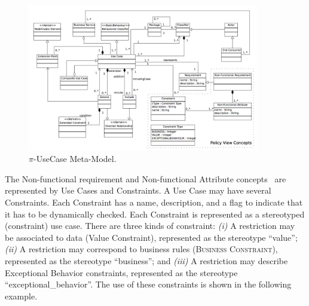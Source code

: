  \begin{figure}
\center
\includegraphics[width=0.9\textwidth]{figs/UseCaseMetaModel.pdf}
\caption{\label{fig:CIM:usecasemetamodel} $\pi$-UseCase Meta-Model.}
\end{figure}


 The {\sc Non-functional requirement} and {\sc Non-functional Attribute} concepts \ are \\ represented by {\sc Use Cases} and {\sc Constraints}. 
A {\sc Use Case} may have several {\sc Constraints}. Each {\sc Constraint} has a name, description, and a flag to indicate that it has to be  dynamically checked.
Each {\sc Con\-straint} is represented as a stereotyped ({\sf constraint}) use case. 
There are three kinds of constraint:
\textit{(i)} A restriction may be associated to data ({\sc Value Constraint}), represented as the stereotype ``value''; 
\textit{(ii)} A restriction may correspond to business rules (\textsc{Business Constraint}), represented as the stereotype {\sf ``business''}; and 
\textit{(iii)} A restriction may describe {\sc Exceptional Behavior} constraints, represented as the stereotype {\sf ``exceptional\_behavior''}.
The use of these constraints is shown in the following example.

